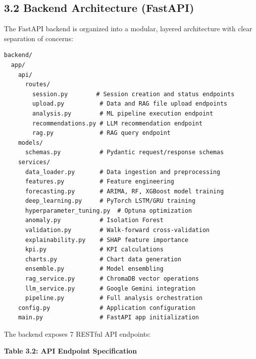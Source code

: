 \documentclass[12pt, a4paper]{report}
\begin{document}
\subsection{3.2 Backend Architecture (FastAPI)}

The FastAPI backend is organized into a modular, layered architecture with clear separation of concerns:

\begin{verbatim}
backend/
  app/
    api/
      routes/
        session.py        # Session creation and status endpoints
        upload.py          # Data and RAG file upload endpoints
        analysis.py        # ML pipeline execution endpoint
        recommendations.py # LLM recommendation endpoint
        rag.py             # RAG query endpoint
    models/
      schemas.py           # Pydantic request/response schemas
    services/
      data_loader.py       # Data ingestion and preprocessing
      features.py          # Feature engineering
      forecasting.py       # ARIMA, RF, XGBoost model training
      deep_learning.py     # PyTorch LSTM/GRU training
      hyperparameter_tuning.py  # Optuna optimization
      anomaly.py           # Isolation Forest
      validation.py        # Walk-forward cross-validation
      explainability.py    # SHAP feature importance
      kpi.py               # KPI calculations
      charts.py            # Chart data generation
      ensemble.py          # Model ensembling
      rag_service.py       # ChromaDB vector operations
      llm_service.py       # Google Gemini integration
      pipeline.py          # Full analysis orchestration
    config.py              # Application configuration
    main.py                # FastAPI app initialization
\end{verbatim}

The backend exposes 7 RESTful API endpoints:

\textbf{Table 3.2: API Endpoint Specification}
\end{document}
